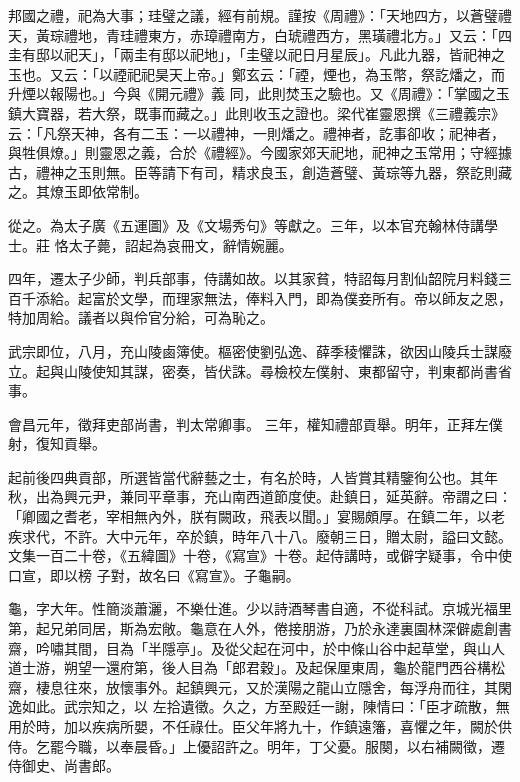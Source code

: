 \begin{pinyinscope}
 邦國之禮，祀為大事；珪璧之議，經有前規。謹按《周禮》：「天地四方，以蒼璧禮天，黃琮禮地，青珪禮東方，赤璋禮南方，白琥禮西方，黑璜禮北方。」又云：「四圭有邸以祀天」，「兩圭有邸以祀地」，「圭璧以祀日月星辰」。凡此九器，皆祀神之玉也。又云：「以禋祀祀昊天上帝。」鄭玄云：「禋，煙也，為玉幣，祭訖燔之，而升煙以報陽也。」今與《開元禮》義
 同，此則焚玉之驗也。又《周禮》：「掌國之玉鎮大寶器，若大祭，既事而藏之。」此則收玉之證也。梁代崔靈恩撰《三禮義宗》云：「凡祭天神，各有二玉：一以禮神，一則燔之。禮神者，訖事卻收；祀神者，與牲俱燎。」則靈恩之義，合於《禮經》。今國家郊天祀地，祀神之玉常用；守經據古，禮神之玉則無。臣等請下有司，精求良玉，創造蒼璧、黃琮等九器，祭訖則藏之。其燎玉即依常制。



 從之。為太子廣《五運圖》及《文場秀句》等獻之。三年，以本官充翰林侍講學士。莊
 恪太子薨，詔起為哀冊文，辭情婉麗。



 四年，遷太子少師，判兵部事，侍講如故。以其家貧，特詔每月割仙韶院月料錢三百千添給。起富於文學，而理家無法，俸料入門，即為僕妾所有。帝以師友之恩，特加周給。議者以與伶官分給，可為恥之。



 武宗即位，八月，充山陵鹵簿使。樞密使劉弘逸、薛季稜懼誅，欲因山陵兵士謀廢立。起與山陵使知其謀，密奏，皆伏誅。尋檢校左僕射、東都留守，判東都尚書省事。



 會昌元年，徵拜吏部尚書，判太常卿事。
 三年，權知禮部貢舉。明年，正拜左僕射，復知貢舉。



 起前後四典貢部，所選皆當代辭藝之士，有名於時，人皆賞其精鑒徇公也。其年秋，出為興元尹，兼同平章事，充山南西道節度使。赴鎮日，延英辭。帝謂之曰：「卿國之耆老，宰相無內外，朕有闕政，飛表以聞。」宴賜頗厚。在鎮二年，以老疾求代，不許。大中元年，卒於鎮，時年八十八。廢朝三日，贈太尉，謚曰文懿。文集一百二十卷，《五緯圖》十卷，《寫宣》十卷。起侍講時，或僻字疑事，令中使口宣，即以榜
 子對，故名曰《寫宣》。子龜嗣。



 龜，字大年。性簡淡蕭灑，不樂仕進。少以詩酒琴書自適，不從科試。京城光福里第，起兄弟同居，斯為宏敞。龜意在人外，倦接朋游，乃於永達裏園林深僻處創書齋，吟嘯其間，目為「半隱亭」。及從父起在河中，於中條山谷中起草堂，與山人道士游，朔望一還府第，後人目為「郎君穀」。及起保厘東周，龜於龍門西谷構松齋，棲息往來，放懷事外。起鎮興元，又於漢陽之龍山立隱舍，每浮舟而往，其閑逸如此。武宗知之，以
 左拾遺徵。久之，方至殿廷一謝，陳情曰：「臣才疏散，無用於時，加以疾病所嬰，不任祿仕。臣父年將九十，作鎮遠籓，喜懼之年，闕於供侍。乞罷今職，以奉晨昏。」上優詔許之。明年，丁父憂。服闋，以右補闕徵，遷侍御史、尚書郎。




\end{pinyinscope}
